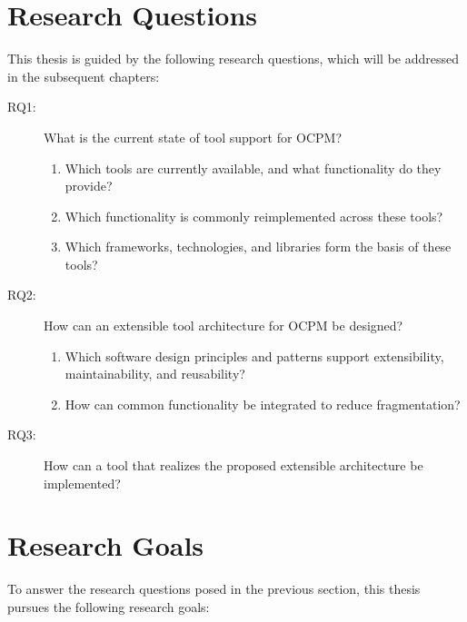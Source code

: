 \section{Research Questions}
\label{sec:intro_ssec:RQs}

This thesis is guided by the following research questions, which will be addressed in the subsequent chapters:

\begin{description}
	\item[RQ1:] What is the current state of tool support for OCPM?
	      \begin{enumerate}[label=\alph*)]
		      \item Which tools are currently available, and what functionality do they provide?
		      \item Which functionality is commonly reimplemented across these tools?
		      \item Which frameworks, technologies, and libraries form the basis of these tools?
	      \end{enumerate}

	\item[RQ2:] How can an extensible tool architecture for OCPM be designed?
	      \begin{enumerate}[label=\alph*)]
		      \item Which software design principles and patterns support extensibility, maintainability, and reusability?
		      \item How can common functionality be integrated to reduce fragmentation?
	      \end{enumerate}

	\item[RQ3:] How can a tool that realizes the proposed extensible architecture be implemented?
\end{description}

\section{Research Goals}
\label{sec:intro_ssec:goals}

To answer the research questions posed in the previous section, this thesis pursues the following research goals:


